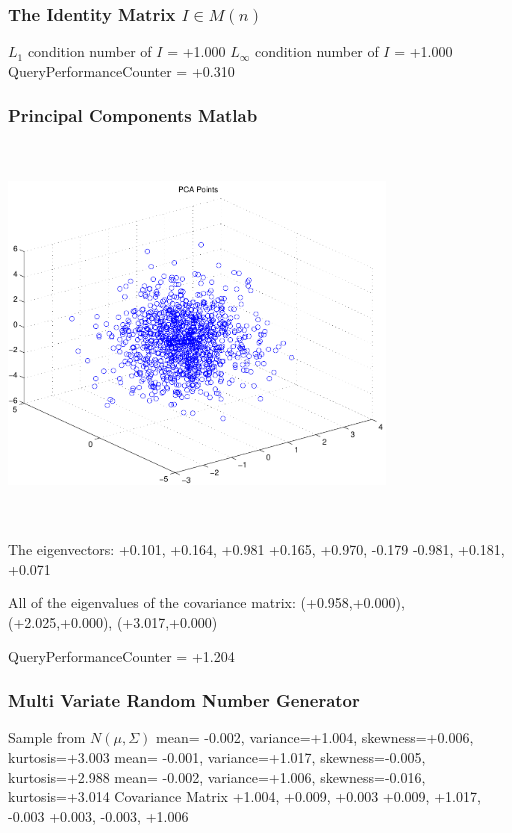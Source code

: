 \documentclass[9pt]{article}
\theoremstyle{plain}
\theoremstyle{definition}
\theoremstyle{remark}
\numberwithin{equation}{section}
\begin{document}
\subsubsection{The Identity Matrix $I \in M(n)$}
$L_1$ condition number of $I$ = +1.000
$L_\infty$ condition number of $I$ = +1.000
QueryPerformanceCounter  =  +0.310
\subsubsection{Principal Components Matlab }
\includegraphics[width=10.0cm,height=10.0cm]{PCAPoints.pdf}

The eigenvectors:
+0.101, +0.164, +0.981
+0.165, +0.970, -0.179
-0.981, +0.181, +0.071

All of the eigenvalues of the covariance matrix:
(+0.958,+0.000), (+2.025,+0.000), (+3.017,+0.000)

QueryPerformanceCounter  =  +1.204
\subsubsection{Multi Variate Random Number Generator }
Sample from $N(\mu,\Sigma)$
mean= -0.002, variance=+1.004, skewness=+0.006, kurtosis=+3.003
mean= -0.001, variance=+1.017, skewness=-0.005, kurtosis=+2.988
mean= -0.002, variance=+1.006, skewness=-0.016, kurtosis=+3.014
Covariance Matrix 
+1.004, +0.009, +0.003
+0.009, +1.017, -0.003
+0.003, -0.003, +1.006
\end{document}
